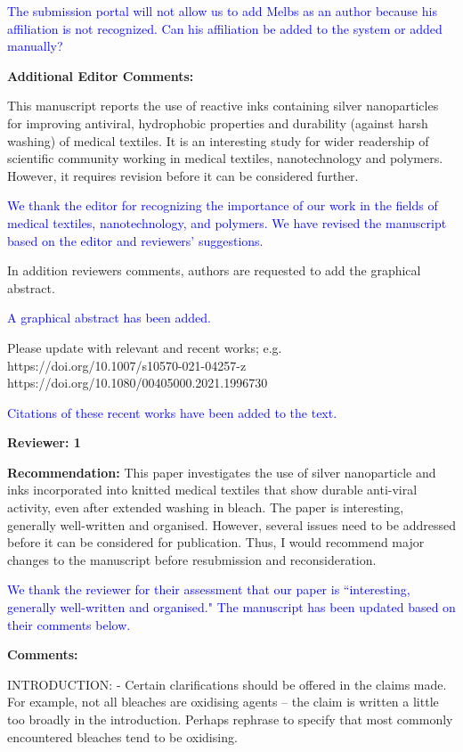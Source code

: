 \documentclass[12pt]{letter}
\newcommand{\blue}[1]{\textcolor{blue}{#1}} %
\begin{document}
\blue{The submission portal will not allow us to  add Melbs as an author because his affiliation is not recognized. Can his affiliation be added to the system or added manually?}

\textbf{Additional Editor Comments:}

This manuscript reports the use of reactive inks containing silver nanoparticles for improving antiviral, hydrophobic properties and durability (against harsh washing) of medical textiles. It is an interesting study for wider readership of scientific community working in medical textiles, nanotechnology and polymers. However, it requires revision before it can be considered further.

\blue{We thank the editor for recognizing the importance of our work in the fields of medical textiles, nanotechnology, and polymers.  We have revised the manuscript based on the editor and reviewers' suggestions.}

In addition reviewers comments, authors are requested to add the graphical abstract.

\blue{A graphical abstract has been added.}

Please update with relevant and recent works; e.g.
https://doi.org/10.1007/s10570-021-04257-z
https://doi.org/10.1080/00405000.2021.1996730

\blue{Citations of these recent works have been added to the text.}

\textbf{Reviewer: 1}

\textbf{Recommendation:} This paper investigates the use of silver nanoparticle and inks incorporated into knitted medical textiles that show durable anti-viral activity, even after extended washing in bleach. 
The paper is interesting, generally well-written and organised. 
However, several issues need to be addressed before it can be considered for publication. Thus, I would recommend major changes to the manuscript before resubmission and reconsideration.

\blue{We thank the reviewer for their assessment that our paper is ``interesting, generally well-written and organised."  The manuscript has been updated based on their comments below.}

\textbf{Comments:}

INTRODUCTION:
- Certain clarifications should be offered in the claims made. For example, not all bleaches are oxidising agents – the claim is written a little too broadly in the introduction. Perhaps rephrase to specify that most commonly encountered bleaches tend to be oxidising.
\end{document}

